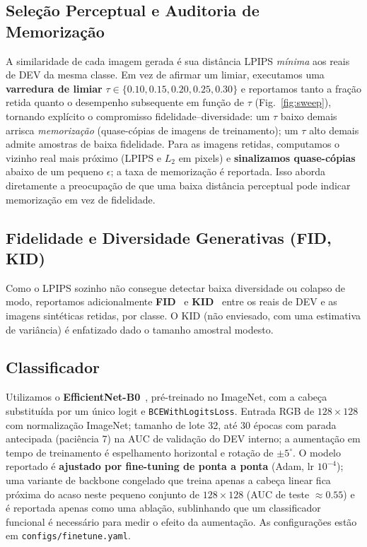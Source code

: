 \documentclass[runningheads]{llncs}
\begin{document}
\subsection{Seleção Perceptual e Auditoria de Memorização}
A similaridade de cada imagem gerada é sua distância LPIPS \emph{mínima} aos reais
de DEV da mesma classe. Em vez de afirmar um limiar, executamos uma
\textbf{varredura de limiar} $\tau\in\{0.10,0.15,0.20,0.25,0.30\}$ e reportamos
tanto a fração retida quanto o desempenho subsequente em função de $\tau$
(Fig.~\ref{fig:sweep}), tornando explícito o compromisso
fidelidade--diversidade: um $\tau$ baixo demais arrisca \emph{memorização}
(quase-cópias de imagens de treinamento); um $\tau$ alto demais admite amostras
de baixa fidelidade. Para as imagens retidas, computamos o vizinho real mais
próximo (LPIPS e $L_2$ em pixels) e \textbf{sinalizamos quase-cópias} abaixo de um
pequeno $\epsilon$; a taxa de memorização é reportada. Isso aborda diretamente a
preocupação de que uma baixa distância perceptual pode indicar memorização em vez
de fidelidade.

\subsection{Fidelidade e Diversidade Generativas (FID, KID)}
Como o LPIPS sozinho não consegue detectar baixa diversidade ou colapso de modo,
reportamos adicionalmente \textbf{FID}~\cite{heusel2017fid} e
\textbf{KID}~\cite{binkowski2018kid} entre os reais de DEV e as imagens sintéticas
retidas, por classe. O KID (não enviesado, com uma estimativa de variância) é
enfatizado dado o tamanho amostral modesto.

\subsection{Classificador}
Utilizamos o \textbf{EfficientNet-B0}~\cite{tan2019efficientnet}, pré-treinado no
ImageNet, com a cabeça substituída por um único logit e
\texttt{BCEWithLogitsLoss}. Entrada RGB de $128\times128$ com normalização
ImageNet; tamanho de lote 32, até 30 épocas com parada antecipada (paciência 7) na
AUC de validação do DEV interno; a aumentação em tempo de treinamento é espelhamento
horizontal e rotação de $\pm5^\circ$. O modelo reportado é \textbf{ajustado por
fine-tuning de ponta a ponta} (Adam, lr $10^{-4}$); uma variante de backbone
congelado que treina apenas a cabeça linear fica próxima do acaso neste pequeno
conjunto de $128\times128$ (AUC de teste $\approx 0.55$) e é reportada apenas como
uma ablação, sublinhando que um classificador funcional é necessário para medir o
efeito da aumentação. As configurações estão em \texttt{configs/finetune.yaml}.
\end{document}
